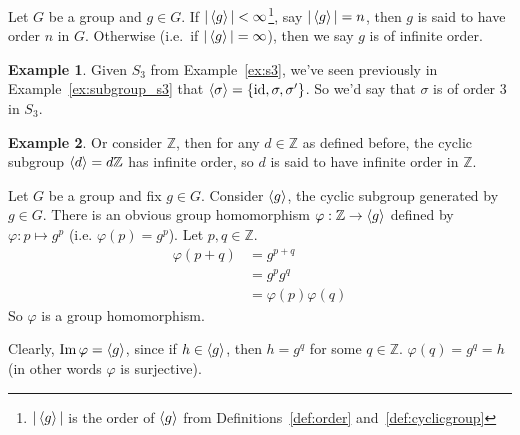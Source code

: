 \documentclass[12pt,letterpaper,DIV=11,final]{scrartcl}
\theoremstyle{plain}
\theoremstyle{definition}
\newtheorem{example}{Example}[section]
\theoremstyle{remark}
\DeclareMathOperator{\id}{id}
\DeclareMathOperator{\ima}{Im}
\begin{document}
Let $G$ be a group and $g \in G$.
If $|\braket{g}| < \infty$\footnote{$|\braket{g}|$ is the order of $\braket{g}$ from Definitions~\ref{def:order} and~\ref{def:cyclicgroup}}, say $| \braket{g} | = n$, then $g$ is said to have order $n$ in $G$.
Otherwise (i.e.\ if $|\braket{g}| = \infty$), then we say $g$ is of infinite order.

\begin{example}\label{ex:order_s3}
  Given $S_3$ from Example~\ref{ex:s3}, we've seen previously in Example~\ref{ex:subgroup_s3} that $\braket{\sigma} = \{ \id, \sigma, \sigma' \}$.
  So we'd say that $\sigma$ is of order 3 in $S_3$.
\end{example}

\begin{example}
  Or consider $\mathbb{Z}$, then for any $d \in \mathbb{Z}$ as defined before, the cyclic subgroup $\braket{d} = d \mathbb{Z}$ has infinite order,
  so $d$ is said to have infinite order in $\mathbb{Z}$.
\end{example}

Let $G$ be a group and fix $g \in G$.
Consider $\braket{g}$, the cyclic subgroup generated by $g \in G$.
There is an obvious group homomorphism $\varphi: \mathbb{Z} \to \braket{g}$ defined by $\varphi : p \mapsto g^p$ (i.e. $\varphi(p) = g^p$).
Let $p, q \in \mathbb{Z}$.
\begin{align*}
  \varphi(p + q) &= g^{p + q} \\
                 &= g^p g^q \\
                 &= \varphi(p) \varphi(q)
\end{align*}
So $\varphi$ is a group homomorphism.

Clearly, $\ima \varphi = \braket{g}$, since if $h \in \braket{g}$, then $h = g^q$ for some $q \in \mathbb{Z}$.
$\varphi(q) = g^q = h$ (in other words $\varphi$ is surjective).
\end{document}
